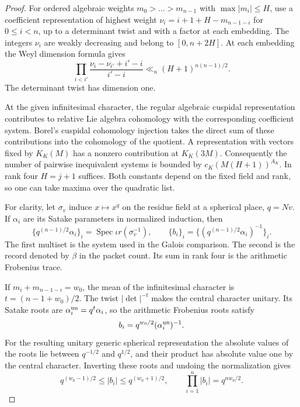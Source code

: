 \begin{proof}
For ordered algebraic weights \(m_0>\dots>m_{n-1}\) with \(\max |m_i|\le H\), use a coefficient representation of highest weight \(\nu_i=i+1+H-m_{n-1-i}\) for \(0\le i<n\), up to a determinant twist and with a factor at each embedding.
The integers \(\nu_i\) are weakly decreasing and belong to
\([0,n+2H]\). At each embedding the Weyl dimension formula gives
\[
     \prod_{i<i'}\frac{\nu_i-\nu_{i'}+i'-i}{i'-i}
                             \ll_n(H+1)^{n(n-1)/2}.
\]
The determinant twist has dimension one.

At the given
infinitesimal character, the regular algebraic cuspidal
representation contributes to relative Lie algebra cohomology
with the corresponding coefficient system. Borel's cuspidal
cohomology injection takes the direct sum of these contributions
into the cohomology of the quotient. A representation with
vectors fixed by \(K_K(M)\) has a nonzero contribution at
\(K_K(3M)\). Consequently the number of pairwise inequivalent
systems is bounded by \(c_K(M(H+1))^{A_K}\). In rank four
\(H=j+1\) suffices. Both constants depend on the fixed field
and rank, so one can take maxima over the quadratic list.
\hfill\mbox{\cite{clozel-motifs,borel-cuspidal}}\label{cor:ordinary-symplectic-cohomology-19}

For clarity, let \(\sigma_v\) induce \(x\mapsto x^q\) on the
residue field at a spherical place, \(q=Nv\). If \(\alpha_i\)
are its Satake parameters in normalized induction, then
\[
       \{q^{(n-1)/2}\alpha_i\}_i
          =\operatorname{Spec}\iota r(\sigma_v^{-1}),\qquad
       \{b_i\}_i=\{(q^{(n-1)/2}\alpha_i)^{-1}\}_i .
\]
The first multiset is the system used in the Galois comparison.
The second is the record denoted by \(\beta\) in the packet
count. Its sum in rank four is the arithmetic Frobenius trace.

If \(m_i+m_{n-1-i}=w_0\), the mean of the infinitesimal
character is \(t=(n-1+w_0)/2\). The twist \(|\det|^{-t}\) makes the central character
unitary. Its Satake roots are \(\alpha_i^{\rm un}=q^t\alpha_i\),
so the arithmetic Frobenius roots satisfy
\[
                b_i=q^{w_0/2}(\alpha_i^{\rm un})^{-1}.
\] For the resulting
unitary generic spherical representation the absolute values
of the roots lie between \(q^{-1/2}\) and \(q^{1/2}\), and
their product has absolute value one by the central character.
Inverting these roots and undoing the normalization gives
\[
 q^{(w_0-1)/2}\le |b_i|\le q^{(w_0+1)/2},\qquad\prod_{i=1}^n|b_i|=q^{nw_0/2}.
\]



\end{proof}
